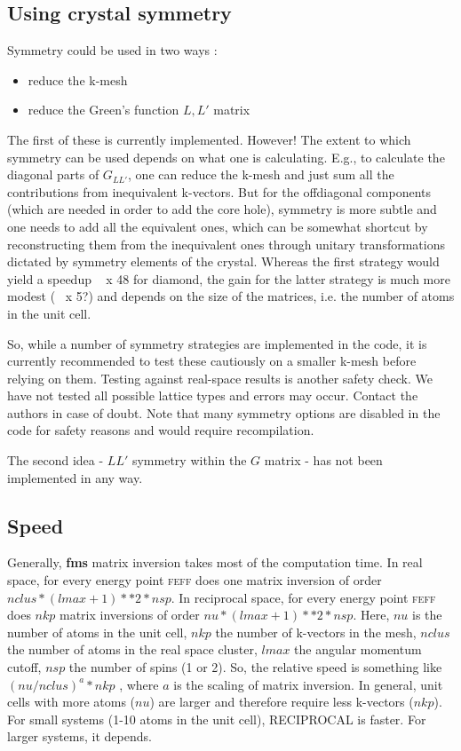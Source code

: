 \documentclass[11pt,oneside]{report} %
\newcommand{\program}[1]{\textsc{#1}}
\newcommand{\feff}{\program{feff}}
\newcommand{\module}[1]{\textrm{\bf{#1}}}
\begin{document}
\subsection{Using crystal symmetry}
Symmetry could be used in two ways :
\begin{itemize} \item	reduce the k-mesh
\item reduce the Green's function $L,L'$ matrix \end{itemize}

The first of these is currently implemented.  However!  The extent to which symmetry can be used depends on what one is calculating.  E.g., to calculate the diagonal parts of $G_{LL'}$, one can reduce the k-mesh and just sum all the contributions from inequivalent k-vectors.  But for the offdiagonal components (which are needed in order to add the core hole), symmetry is more subtle and one needs to add all the equivalent ones, which can be somewhat shortcut by reconstructing them from the inequivalent ones through unitary transformations dictated by symmetry elements of the crystal.  Whereas the first strategy would yield a speedup ~ x 48 for diamond, the gain for the latter strategy is much more modest (~ x 5?) and depends on the size of the matrices, i.e. the number of atoms in the unit cell.

So, while a number of symmetry strategies are implemented in the code, it is currently recommended to test these cautiously on a smaller k-mesh before relying on them.  Testing against real-space results is another safety check.  We have not tested all possible lattice types and errors may occur.  Contact the authors in case of doubt.  Note that many symmetry options are disabled in the code for safety reasons and would require recompilation.

The second idea - $LL'$ symmetry within the $G$ matrix - has not been implemented in any way.


\subsection{Speed}
Generally, \module{fms} matrix inversion takes most of the computation time.
In real space, for every energy point {\feff} does one matrix inversion of order $nclus*(lmax+1)**2*nsp$.
In reciprocal space, for every energy point {\feff} does $nkp$ matrix inversions of order $nu*(lmax+1)**2*nsp$.
 Here, $nu$ is the number of atoms in the unit cell, $nkp$ the number of k-vectors in the mesh, $nclus$ the number of atoms in the real space cluster, $lmax$ the angular momentum cutoff, $nsp$ the number of spins (1 or 2).
So, the relative speed is something like $(nu/nclus)^a * nkp$ , where $a$ is the scaling of matrix inversion.
In general, unit cells with more atoms ($nu$) are larger and therefore require less k-vectors ($nkp$).  For small systems (1-10 atoms in the unit cell), RECIPROCAL is faster.  For larger systems, it depends.
\end{document}
